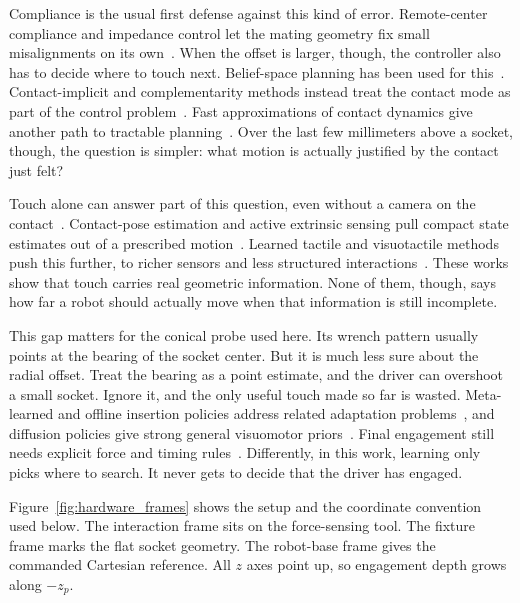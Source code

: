 \documentclass[letterpaper,10 pt,conference]{ieeeconf}
\begin{document}
Compliance is the usual first defense against this kind of error.
Remote-center compliance and impedance control let the mating geometry fix
small misalignments on its
own~\cite{whitney1982quasistatic,hogan1985impedance}.  When the offset is
larger, though, the controller also has to decide where to touch next.
Belief-space planning has been used for
this~\cite{wirnshofer2020partial,chintalapudi2026bilevel,noseworthy2025forge}.
Contact-implicit and complementarity methods instead treat the contact mode
as part of the control
problem~\cite{lecleach2024fast,aydinoglu2024consensus,yang2024sliding}.
Fast approximations of contact dynamics give another path to tractable
planning~\cite{carpentier2024contact,graesdal2024convex,suh2026trust}.  Over
the last few millimeters above a socket, though, the question is simpler:
what motion is actually justified by the contact just felt?

Touch alone can answer part of this question, even without a camera on the
contact~\cite{li2020review}.  Contact-pose estimation and active extrinsic
sensing pull compact state estimates out of a prescribed
motion~\cite{jin2021contact,kim2022active}.  Learned tactile and
visuotactile methods push this further, to richer sensors and less
structured
interactions~\cite{calandra2017feeling,lee2019visiontouch,higuera2025sparsh,
zhao2025t3,liang2022tactile,ai2024robopack,oller2024tactile,
ferrandis2025visuotactile,huang2025vitac,yu2025mimictouch,
lin2024touching}.  These works show that touch carries real geometric
information.  None of them, though, says how far a robot should actually
move when that information is still incomplete.

This gap matters for the conical probe used here.  Its wrench pattern
usually points at the bearing of the socket center.  But it is much less
sure about the radial offset.  Treat the bearing as a point estimate, and
the driver can overshoot a small socket.  Ignore it, and the only useful
touch made so far is wasted.  Meta-learned and offline insertion policies
address related adaptation
problems~\cite{schoettler2020meta,zhao2022offline}, and diffusion policies
give strong general visuomotor priors~\cite{chi2023diffusion}.  Final
engagement still needs explicit force and timing
rules~\cite{chen2025funnel,xue2025predictive,xu2025sequensync}.
Differently, in this work, learning only picks where to search.  It never
gets to decide that the driver has engaged.

Figure~\ref{fig:hardware_frames} shows the setup and the coordinate
convention used below.  The interaction frame sits on the force-sensing
tool.  The fixture frame marks the flat socket geometry.  The robot-base
frame gives the commanded Cartesian reference.  All $z$ axes point up, so
engagement depth grows along $-z_p$.
\end{document}
